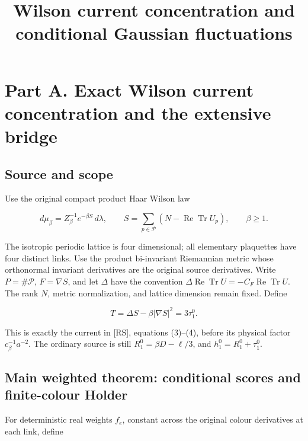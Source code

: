 \documentclass[
  11pt,
]{article}
\title{Wilson current concentration and conditional Gaussian fluctuations}\author{}\date{}
\begin{document}
\maketitle
\hypertarget{part-a.-exact-wilson-current-concentration-and-the-extensive-bridge}{%
\section{Part A. Exact Wilson current concentration and the extensive
bridge}\label{part-a.-exact-wilson-current-concentration-and-the-extensive-bridge}}

\hypertarget{source-and-scope}{%
\subsection{Source and scope}\label{source-and-scope}}

Use the original compact product Haar Wilson law

\[
 d\mu_\beta=Z_\beta^{-1}e^{-\beta S}\,d\lambda,
 \qquad S=\sum_{p\in\mathcal P}(N-\operatorname{Re}\operatorname{Tr}U_p),
 \qquad \beta\ge1.
\]

The isotropic periodic lattice is four dimensional; all elementary
plaquettes have four distinct links. Use the product bi-invariant
Riemannian metric whose orthonormal invariant derivatives are the
original source derivatives. Write \(P=\#\mathcal P\), \(F=\nabla S\),
and let \(\Delta\) have the convention
\(\Delta\operatorname{Re}\operatorname{Tr}U=-C_F\operatorname{Re}\operatorname{Tr}U\).
The rank \(N\), metric normalization, and lattice dimension remain
fixed. Define

\[
 T=\Delta S-\beta|\nabla S|^2=3\tau_1^0.
\]

This is exactly the current in [RS], equations (3)--(4), before its physical factor
\(c_\beta^{-1}a^{-2}\). The ordinary source is still
\(R_1^0=\beta D-\ell/3\), and \(h_1^0=R_1^0+\tau_1^0\).

\hypertarget{main-weighted-theorem-conditional-scores-and-finite-colour-holder}{%
\subsection{Main weighted theorem: conditional scores and finite-colour
Holder}\label{main-weighted-theorem-conditional-scores-and-finite-colour-holder}}

For deterministic real weights \(f_e\), constant across the original
colour derivatives at each link, define
\end{document}
